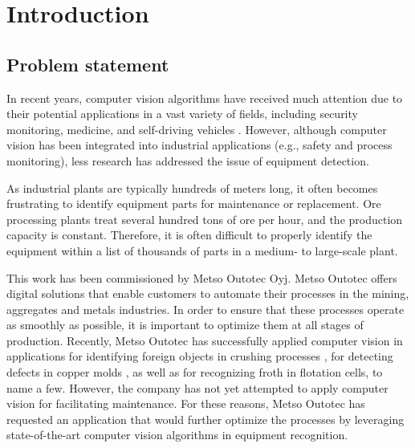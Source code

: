 \documentclass[english, 12pt, a4paper, elec, utf8, a-1b, online]{aaltothesis}
\begin{document}
\listoftodos

\cleardoublepage

\section{Introduction}

\thispagestyle{empty}
\subsection{Problem statement}
In recent years, computer vision algorithms have received much attention due to their potential applications in a vast variety of fields, including security monitoring\cite{Awalgaonkar2020}, medicine\cite{9689485}, and self-driving vehicles \cite{Janai2017, Shan2018}. However, although computer vision has been integrated into industrial applications (e.g., safety and process monitoring)\cite{Banf2022, Awalgaonkar2020}, less research has addressed the issue of equipment detection.

As industrial plants are typically hundreds of meters long, it often becomes frustrating to identify equipment parts for maintenance or replacement. Ore processing plants treat several hundred tons of ore per hour, and the production capacity is constant. Therefore, it is often difficult to properly identify the equipment within a list of thousands of parts in a medium- to large-scale plant.

This work has been commissioned by Metso Outotec Oyj.  Metso Outotec offers digital solutions that enable customers to automate their processes in the mining, aggregates and metals industries. In order to ensure that these processes operate as smoothly as possible, it is important to optimize them at all stages of production. Recently, Metso Outotec has successfully applied computer vision in applications for identifying foreign objects in crushing processes \cite{metso_outotec_2022}, for detecting defects in copper molds\cite{metso_outotec_2022_2} , as well as for recognizing froth in flotation cells\cite{metso_outotec_2022_1}, to name a few. However, the company has not yet attempted to apply computer vision for facilitating maintenance. For these reasons, Metso Outotec has requested an application that would further optimize the processes by leveraging state-of-the-art computer vision algorithms in equipment recognition. 
\end{document}
